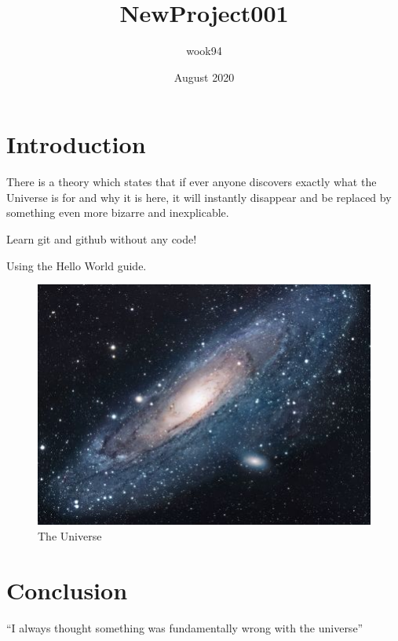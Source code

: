 \documentclass{article}
\title{NewProject001}
\author{wook94 }
\date{August 2020}
\begin{document}
\maketitle

\section{Introduction}
There is a theory which states that if ever anyone discovers exactly what the Universe is for and why it is here, it will instantly disappear and be replaced by something even more bizarre and inexplicable.

Learn git and github without any code!

Using the Hello World guide.

\begin{figure}[h!]
\centering
\includegraphics[scale=1.6]{universe}
\caption{The Universe}
\label{fig:universe}
\end{figure}

\section{Conclusion}
``I always thought something was fundamentally wrong with the universe'' \citep{adams1995hitchhiker}



\end{document}
